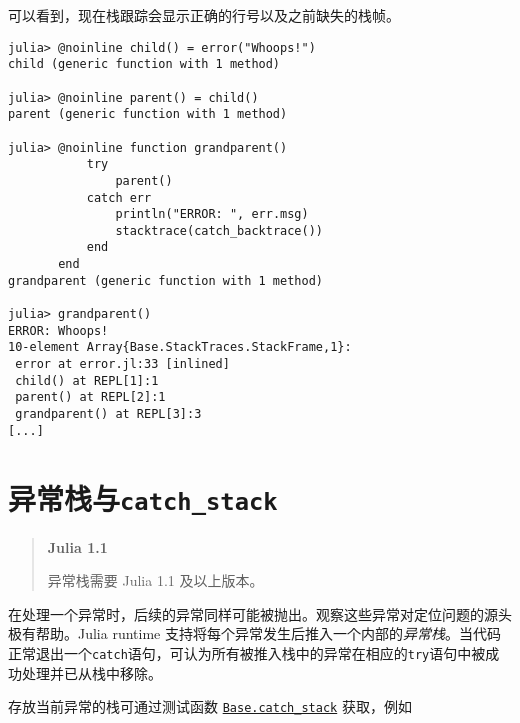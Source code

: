 可以看到，现在栈跟踪会显示正确的行号以及之前缺失的栈帧。




\begin{verbatim}
julia> @noinline child() = error("Whoops!")
child (generic function with 1 method)

julia> @noinline parent() = child()
parent (generic function with 1 method)

julia> @noinline function grandparent()
           try
               parent()
           catch err
               println("ERROR: ", err.msg)
               stacktrace(catch_backtrace())
           end
       end
grandparent (generic function with 1 method)

julia> grandparent()
ERROR: Whoops!
10-element Array{Base.StackTraces.StackFrame,1}:
 error at error.jl:33 [inlined]
 child() at REPL[1]:1
 parent() at REPL[2]:1
 grandparent() at REPL[3]:3
[...]
\end{verbatim}



\hypertarget{11791934492396691703}{}


\section{异常栈与\texttt{catch\_stack}}



\begin{quote}
\textbf{Julia 1.1}

异常栈需要 Julia 1.1 及以上版本。

\end{quote}


在处理一个异常时，后续的异常同样可能被抛出。观察这些异常对定位问题的源头极有帮助。Julia runtime 支持将每个异常发生后推入一个内部的\emph{异常栈}。当代码正常退出一个\texttt{catch}语句，可认为所有被推入栈中的异常在相应的\texttt{try}语句中被成功处理并已从栈中移除。



存放当前异常的栈可通过测试函数 \hyperlink{5950075931444385711}{\texttt{Base.catch\_stack}} 获取，例如




